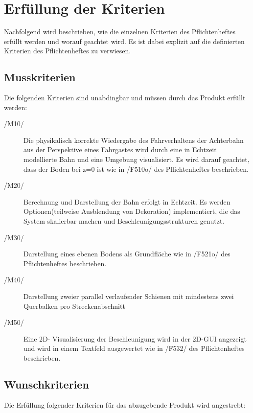 \chapter{Erfüllung der Kriterien}

Nachfolgend wird beschrieben, wie die einzelnen Kriterien des Pflichtenheftes
erfüllt werden und worauf geachtet wird.  Es ist dabei explizit auf die
definierten Kriterien des Pflichtenheftes zu verwiesen.
\section{Musskriterien}

Die folgenden Kriterien sind unabdingbar und müssen durch das Produkt erfüllt
werden:
\begin{description}
	\item[/M10/] Die physikalisch korrekte Wiedergabe des Fahrverhaltens der Achterbahn aus der Perspektive eines Fahrgastes wird durch eine in Echtzeit modellierte Bahn und eine Umgebung visualisiert. Es wird darauf geachtet, dass der Boden bei z=0 ist wie in /F510o/ des Pflichtenheftes beschrieben.
	\item[/M20/] Berechnung und Darstellung der Bahn erfolgt in Echtzeit. Es werden Optionen(teilweise Ausblendung von Dekoration) implementiert, die das System skalierbar machen und Beschleunigungsstrukturen genutzt.
	\item[/M30/] Darstellung eines ebenen Bodens als Grundfläche wie in /F521o/ des Pflichtenheftes beschrieben.
	\item[/M40/] Darstellung zweier parallel verlaufender Schienen mit mindestens zwei Querbalken pro Streckenabschnitt
	\item[/M50/] Eine 2D- Visualisierung der Beschleunigung wird in der 2D-GUI angezeigt und wird in einem Textfeld ausgewertet wie in /F532/ des Pflichtenheftes beschrieben.
\end{description}

\section{Wunschkriterien}
Die Erfüllung folgender Kriterien für das abzugebende Produkt wird angestrebt:


